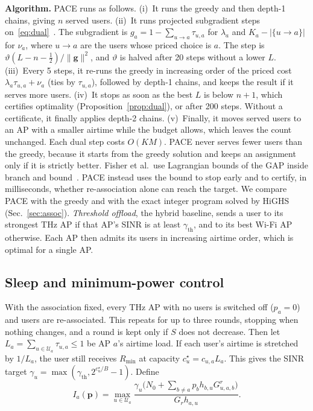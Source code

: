 \documentclass[conference]{IEEEtran}
\newcommand{\Rmin}{R_{\min}}
\begin{document}
\textbf{Algorithm.}
PACE runs as follows.
(i)~It runs the greedy and then depth-1 chains, giving $n$ served users.
(ii)~It runs projected subgradient steps on~\eqref{eq:dual}~\cite{held1974subgradient}.
The subgradient is $g_a=1-\sum_{u\to a}\tau_{u,a}$ for $\lambda_a$ and $K_a-|\{u\to a\}|$ for $\nu_a$, where $u\to a$ are the users whose priced choice is $a$.
The step is $\vartheta(L-n-\tfrac12)/\lVert\mathbf g\rVert^2$, and $\vartheta$ is halved after 20 steps without a lower $L$.
(iii)~Every 5 steps, it re-runs the greedy in increasing order of the priced cost $\lambda_a\tau_{u,a}+\nu_a$ (ties by $\tau_{u,a}$), followed by depth-1 chains, and keeps the result if it serves more users.
(iv)~It stops as soon as the best $L$ is below $n+1$, which certifies optimality (Proposition~\ref{prop:dual}), or after 200 steps.
Without a certificate, it finally applies depth-2 chains.
(v)~Finally, it moves served users to an AP with a smaller airtime while the budget allows, which leaves the count unchanged.
Each dual step costs $O(KM)$.
PACE never serves fewer users than the greedy, because it starts from the greedy solution and keeps an assignment only if it is strictly better.
Fisher et al.\ use Lagrangian bounds of the GAP inside branch and bound~\cite{fisher1986multiplier}.
PACE instead uses the bound to stop early and to certify, in milliseconds, whether re-association alone can reach the target.
We compare PACE with the greedy and with the exact integer program solved by HiGHS~\cite{huangfu2018highs} (Sec.~\ref{sec:assoc}).
\emph{Threshold offload}, the hybrid baseline, sends a user to its strongest THz AP if that AP's SINR is at least $\gamma_{\text{th}}$, and to its best Wi-Fi AP otherwise.
Each AP then admits its users in increasing airtime order, which is optimal for a single AP.

\subsection{Sleep and minimum-power control}
With the association fixed, every THz AP with no users is switched off ($p_a=0$) and users are re-associated.
This repeats for up to three rounds, stopping when nothing changes, and a round is kept only if $S$ does not decrease.
Then let $L_a=\sum_{u\in\mathcal{U}_a}\tau_{u,a}\le1$ be AP $a$'s airtime load.
If each user's airtime is stretched by $1/L_a$, the user still receives $\Rmin$ at capacity $c^\star_u=c_{u,a}L_a$.
This gives the SINR target $\gamma_u=\max(\gamma_{\text{th}},2^{c^\star_u/B}-1)$.
Define
\begin{equation}
I_a(\mathbf{p})=\max_{u\in\mathcal{U}_a}\frac{\gamma_u\big(N_0+\sum_{b\ne a}p_b h_{b,u}G^r_{u,a,b}\big)}{G_r h_{a,u}}.\label{eq:yates}
\end{equation}
\end{document}
